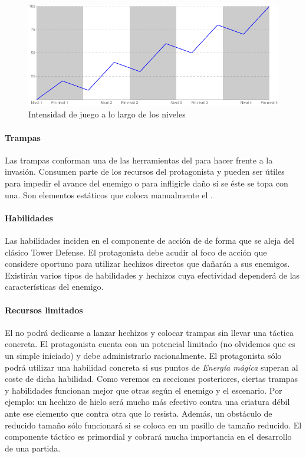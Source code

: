 \begin{figure}[H]
    \centering
        \includegraphics[width=12cm]{img/intensidad.png} 
    \caption{Intensidad de juego a lo largo de los niveles}
    \label{img:intensidad}
\end{figure}

\paragraph{Trampas}
Las trampas conforman una de las herramientas del \jugador para hacer frente
a la invasión. Consumen parte de los recursos del protagonista y pueden
ser útiles para impedir el avance del enemigo o para infligirle daño
si se éste se topa con una. Son elementos estáticos que coloca manualmente
el \jugador.

\paragraph{Habilidades}
Las habilidades inciden en el componente de acción de \juego de forma que
se aleja del clásico Tower Defense. El protagonista debe acudir al foco de
acción que considere oportuno para utilizar hechizos directos que dañarán
a sus enemigos. Existirán varios tipos de habilidades y hechizos cuya efectividad
dependerá de las características del enemigo.

\paragraph{Recursos limitados}
El \jugador no podrá dedicarse a lanzar hechizos y colocar trampas sin
llevar una táctica concreta. El protagonista cuenta con un potencial limitado
(no olvidemos que es un simple iniciado) y debe administrarlo racionalmente.
El protagonista sólo podrá utilizar una habilidad concreta si sus puntos de
\emph{Energía mágica} superan al coste de dicha habilidad. Como veremos en secciones
posteriores, ciertas trampas y habilidades funcionan mejor que otras según
el enemigo y el escenario. Por ejemplo: un hechizo de hielo será mucho más
efectivo contra una criatura débil ante ese elemento que contra otra que lo resista.
Además, un obstáculo de reducido tamaño sólo funcionará si se coloca en un
pasillo de tamaño reducido. El componente táctico es primordial y cobrará mucha
importancia en el desarrollo de una partida.

